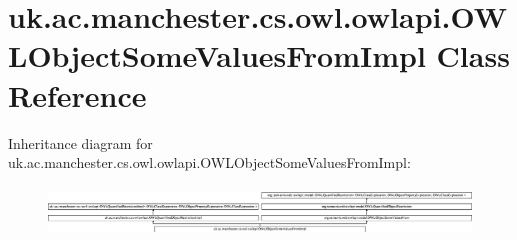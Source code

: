 \hypertarget{classuk_1_1ac_1_1manchester_1_1cs_1_1owl_1_1owlapi_1_1_o_w_l_object_some_values_from_impl}{\section{uk.\-ac.\-manchester.\-cs.\-owl.\-owlapi.\-O\-W\-L\-Object\-Some\-Values\-From\-Impl Class Reference}
\label{classuk_1_1ac_1_1manchester_1_1cs_1_1owl_1_1owlapi_1_1_o_w_l_object_some_values_from_impl}
}
Inheritance diagram for uk.\-ac.\-manchester.\-cs.\-owl.\-owlapi.\-O\-W\-L\-Object\-Some\-Values\-From\-Impl\-:\begin{figure}[H]
\begin{center}
\leavevmode
\includegraphics[height=1.328588cm]{classuk_1_1ac_1_1manchester_1_1cs_1_1owl_1_1owlapi_1_1_o_w_l_object_some_values_from_impl}
\end{center}
\end{figure}

